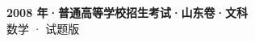\documentclass[zihao=-4, a4paper]{ctexart}
\begin{document}
\begin{center}
  {\Large\bfseries 2008 年·普通高等学校招生考试·山东卷·文科}\\[4pt]
  {\large 数学 · 试题版}
\end{center}
\medskip
{}

\end{document}
